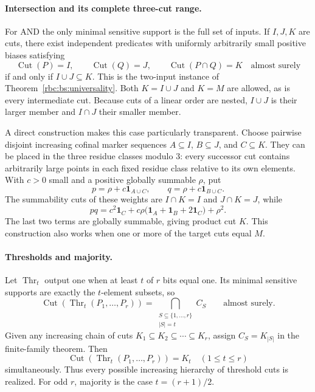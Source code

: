 \documentclass[11pt]{article}
\numberwithin{equation}{section}
\theoremstyle{definition}
\theoremstyle{remark}
\newcommand{\Cut}{\operatorname{Cut}}
\begin{document}
\paragraph{Intersection and its complete three-cut range.}
For AND the only minimal sensitive support is the full set of inputs.
If $I,J,K$ are cuts, there exist independent predicates with uniformly
arbitrarily small positive biases satisfying
\begin{equation}
\label{rbc:bs:triple}
  \Cut(P)=I,\qquad \Cut(Q)=J,\qquad
  \Cut(P\cap Q)=K
  \quad\text{almost surely}
\end{equation}
if and only if $I\cup J\subseteq K$.  This is the two-input instance of
Theorem~\ref{rbc:bs:universality}.  Both $K=I\cup J$ and $K=M$ are allowed,
as is every intermediate cut.  Because cuts of a linear order are
nested, $I\cup J$ is their larger member and $I\cap J$ their smaller
member.

A direct construction makes this case particularly transparent.  Choose
pairwise disjoint increasing cofinal marker sequences
$A\subseteq I$, $B\subseteq J$, and $C\subseteq K$.  They can be placed
in the three residue classes modulo $3$: every successor cut contains
arbitrarily large points in each fixed residue class relative to its own
elements.  With $c>0$ small and a positive globally summable $\rho$, put
\[
  p=\rho+c\mathbf1_{A\cup C},\qquad
  q=\rho+c\mathbf1_{B\cup C}.
\]
The summability cuts of these weights are $I\cap K=I$ and $J\cap K=J$,
while
\[
  pq=c^2\mathbf1_C
    +c\rho\bigl(\mathbf1_A+\mathbf1_B+2\mathbf1_C\bigr)+\rho^2.
\]
The last two terms are globally summable, giving product cut $K$.
This construction also works when one or more of the target cuts equal
$M$.

\paragraph{Thresholds and majority.}
Let $\operatorname{Thr}_t$ output one when at least $t$ of $r$ bits equal
one.  Its minimal sensitive supports are exactly the $t$-element subsets,
so
\begin{equation}
\label{rbc:bs:threshold}
  \Cut(\operatorname{Thr}_t(P_1,\ldots,P_r))
       =\bigcap_{\substack{S\subseteq\{1,\ldots,r\}\\|S|=t}}C_S
       \qquad\text{almost surely}.
\end{equation}
Given any increasing chain of cuts
$K_1\subseteq K_2\subseteq\cdots\subseteq K_r$, assign
$C_S=K_{|S|}$ in the finite-family theorem.  Then
\[
  \Cut(\operatorname{Thr}_t(P_1,\ldots,P_r))=K_t
  \quad(1\leq t\leq r)
\]
simultaneously.  Thus every possible increasing hierarchy of threshold
cuts is realized.  For odd $r$, majority is the case $t=(r+1)/2$.
\end{document}
